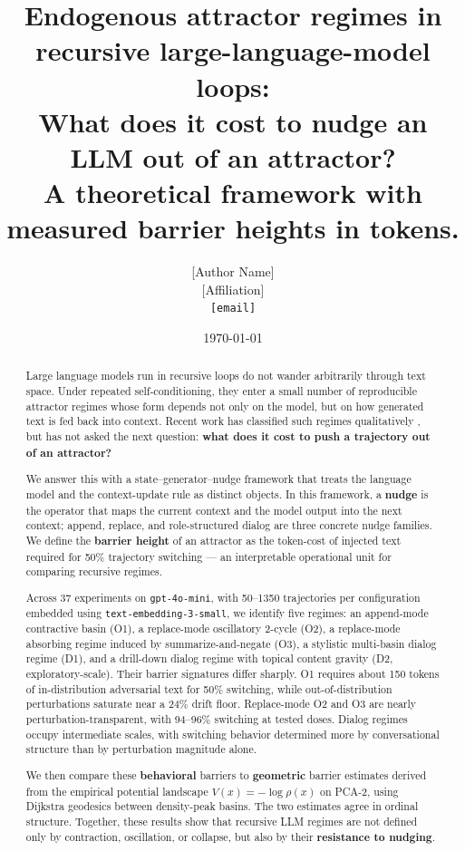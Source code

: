 \documentclass{article}
\title{Endogenous attractor regimes in recursive large-language-model loops:\\
       What does it cost to nudge an LLM out of an attractor?\\
       A theoretical framework with measured barrier heights in tokens.}
\author{[Author Name]\\{}[Affiliation]\\\texttt{[email]}}
\date{\today}
\theoremstyle{plain}
\theoremstyle{definition}
\begin{document}
\maketitle


\begin{abstract}
Large language models run in recursive loops do not wander arbitrarily
through text space. Under repeated self-conditioning, they enter a
small number of reproducible attractor regimes whose form depends not
only on the model, but on how generated text is fed back into context.
Recent work has classified such regimes qualitatively
\citep{arxiv251210350,arxiv251021258,arxiv251024797}, but has not
asked the next question: \textbf{what does it cost to push a trajectory out
of an attractor?}

We answer this with a state–generator–nudge framework that treats the
language model and the context-update rule as distinct objects. In this
framework, a \textbf{nudge} is the operator that maps the current context
and the model output into the next context; append, replace, and
role-structured dialog are three concrete nudge families. We define
the \textbf{barrier height} of an attractor as the token-cost of injected
text required for 50\% trajectory switching — an interpretable
operational unit for comparing recursive regimes.

Across 37 experiments on \texttt{gpt-4o-mini}, with 50–1350 trajectories per
configuration embedded using \texttt{text-embedding-3-small}, we identify
five regimes: an append-mode contractive basin (O1), a replace-mode
oscillatory 2-cycle (O2), a replace-mode absorbing regime induced by
summarize-and-negate (O3), a stylistic multi-basin dialog regime (D1),
and a drill-down dialog regime with topical content gravity (D2,
exploratory-scale). Their barrier signatures differ sharply. O1
requires about 150 tokens of in-distribution adversarial text for 50\%
switching, while out-of-distribution perturbations saturate near a
24\% drift floor. Replace-mode O2 and O3 are nearly
perturbation-transparent, with 94–96\% switching at tested doses.
Dialog regimes occupy intermediate scales, with switching behavior
determined more by conversational structure than by perturbation
magnitude alone.

We then compare these \textbf{behavioral} barriers to \textbf{geometric} barrier
estimates derived from the empirical potential landscape
$V(x) = -\log \rho(x)$ on PCA-2, using Dijkstra geodesics between
density-peak basins. The two estimates agree in ordinal structure.
Together, these results show that recursive LLM regimes are not
defined only by contraction, oscillation, or collapse, but also by
their \textbf{resistance to nudging}.


\end{abstract}
\end{document}
